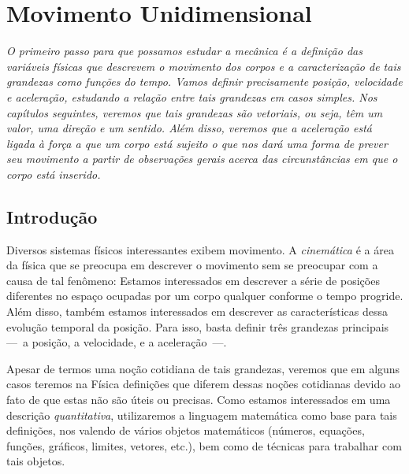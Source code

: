 \chapter{Movimento Unidimensional}
\label{Chap:MovimentoUnidimensional}



\begin{fullwidth}
{\it
O primeiro passo para que possamos estudar a mecânica é a definição das variáveis físicas que descrevem o movimento dos corpos e a caracterização de tais grandezas como funções do tempo. Vamos definir precisamente posição, velocidade e aceleração, estudando a relação entre tais grandezas em casos simples. Nos capítulos seguintes, veremos que tais grandezas são vetoriais, ou seja, têm um valor, uma direção e um sentido. Além disso, veremos que a aceleração está ligada à força a que um corpo está sujeito o que nos dará uma forma de prever seu movimento a partir de observações gerais acerca das circunstâncias em que o corpo está inserido.
}
\end{fullwidth}

\section{Introdução}

Diversos sistemas físicos interessantes exibem movimento. A \emph{cinemática} é a área da física que se preocupa em descrever o movimento sem se preocupar com a causa de tal fenômeno: Estamos interessados em descrever a série de posições diferentes no espaço ocupadas por um corpo qualquer conforme o tempo progride. Além disso, também estamos interessados em descrever as características dessa evolução temporal da posição. Para isso, basta definir três grandezas principais ---~a posição, a velocidade, e a aceleração~---.

Apesar de termos uma noção cotidiana de tais grandezas, veremos que em alguns casos teremos na Física definições que diferem dessas noções cotidianas devido ao fato de que estas não são úteis ou precisas. Como estamos interessados em uma descrição \emph{quantitativa}, utilizaremos a linguagem matemática como base para tais definições, nos valendo de vários objetos matemáticos (números, equações, funções, gráficos, limites, vetores, etc.), bem como de técnicas para trabalhar com tais objetos.


